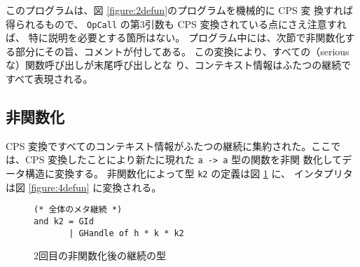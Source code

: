 このプログラムは、図 \ref{figure:2defun}のプログラムを機械的に CPS 変
換すれば得られるもので、
\texttt{OpCall} の第3引数も CPS 変換されている点にさえ注意すれば、
特に説明を必要とする箇所はない。
プログラム中には、次節で非関数化する部分にその旨、コメントが付してある。
この変換により、すべての（serious な）関数呼び出しが末尾呼び出しとな
り、コンテキスト情報はふたつの継続ですべて表現される。

\subsection{非関数化}
\label{subsection:4defun}

CPS 変換ですべてのコンテキスト情報がふたつの継続に集約された。ここで
は、CPS 変換したことにより新たに現れた \texttt{a -> a} 型の関数を非関
数化してデータ構造に変換する。
非関数化によって型 \texttt{k2} の定義は図 \ref{figure:k2_4defun} に、
インタプリタは図 \ref{figure:4defun} に変換される。


\begin{figure}
\begin{verbatim}
(* 全体のメタ継続 *)
and k2 = GId
       | GHandle of h * k * k2
\end{verbatim}
\caption{2回目の非関数化後の継続の型}
\label{figure:k2_4defun}
\end{figure}


